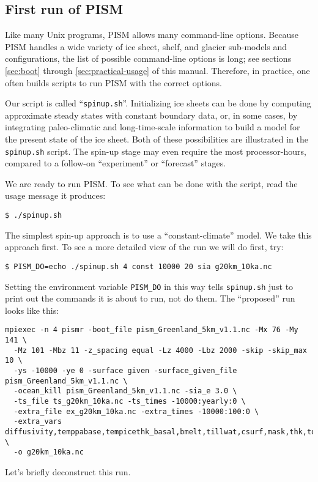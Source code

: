 \subsection{First run of PISM}   \label{subsect:runscript}  Like many Unix programs, PISM allows many command-line options.  Because PISM handles a wide variety of ice sheet, shelf, and glacier sub-models and configurations, the list of possible command-line options is long; see sections \ref{sec:boot} through \ref{sec:practical-usage} of this manual.  Therefore, in practice, one often builds scripts to run PISM with the correct options.

Our script is called ``\texttt{spinup.sh}''.  Initializing ice sheets can be done by computing approximate steady states with constant boundary data, or, in some cases, by integrating paleo-climatic and long-time-scale information to build a model for the present state of the ice sheet.  Both of these possibilities are illustrated in the \texttt{spinup.sh} script.  The spin-up stage may even require the most processor-hours, compared to a follow-on ``experiment'' or ``forecast'' stages.

We are ready to run PISM.  To see what can be done with the script, read the usage message it produces:
\begin{verbatim}
$ ./spinup.sh
\end{verbatim}

The simplest spin-up approach is to use a ``constant-climate'' model.  We take this approach first.  To see a more detailed view of the run we will do first, try:
\begin{verbatim}
$ PISM_DO=echo ./spinup.sh 4 const 10000 20 sia g20km_10ka.nc
\end{verbatim}
Setting the environment variable \texttt{PISM_DO} in this way tells \texttt{spinup.sh} just to print out the commands it is about to run, not do them.  The ``proposed'' run looks like this:
\small
\begin{verbatim}
mpiexec -n 4 pismr -boot_file pism_Greenland_5km_v1.1.nc -Mx 76 -My 141 \
  -Mz 101 -Mbz 11 -z_spacing equal -Lz 4000 -Lbz 2000 -skip -skip_max 10 \
  -ys -10000 -ye 0 -surface given -surface_given_file pism_Greenland_5km_v1.1.nc \
  -ocean_kill pism_Greenland_5km_v1.1.nc -sia_e 3.0 \
  -ts_file ts_g20km_10ka.nc -ts_times -10000:yearly:0 \
  -extra_file ex_g20km_10ka.nc -extra_times -10000:100:0 \
  -extra_vars diffusivity,temppabase,tempicethk_basal,bmelt,tillwat,csurf,mask,thk,topg,usurf \
  -o g20km_10ka.nc
\end{verbatim}
\normalsize
Let's briefly deconstruct this run.

